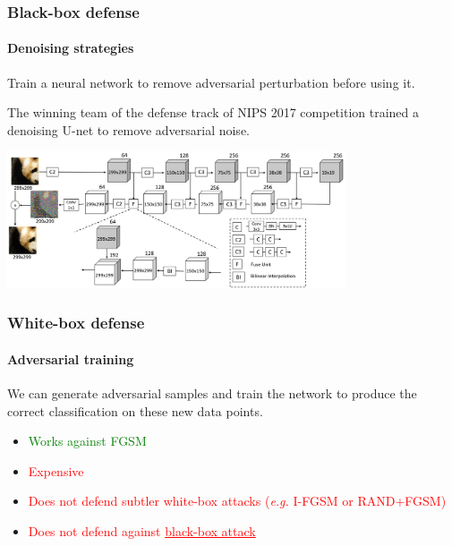 \documentclass[9pt]{beamer}
\begin{document}
\begin{frame}
  \frametitle{Black-box defense}

  \framesubtitle{Denoising strategies}

  Train a neural network to remove adversarial perturbation before
  using it.

  \medskip

  The winning team of the defense track of NIPS 2017 competition
  trained a denoising U-net to remove adversarial noise.

  \bigskip

  \begin{center}
    \includegraphics[width = 10cm]{images/dunet.png}
  \end{center}


\end{frame}

\begin{frame}
  \frametitle{White-box defense}

  \framesubtitle{Adversarial training}

  We can generate adversarial samples and train the network to produce
  the correct classification on these new data points.

  \medskip

  \begin{itemize}
  \item \textcolor{green}{Works against FGSM}
  \item \textcolor{red}{Expensive}
  \item \textcolor{red}{Does not defend subtler white-box
    attacks (\textit{e.g.} I-FGSM or RAND+FGSM)}
  \item \textcolor{red}{Does not defend against \underline{black-box
      attack}}
  \end{itemize}
\end{frame}
\end{document}
